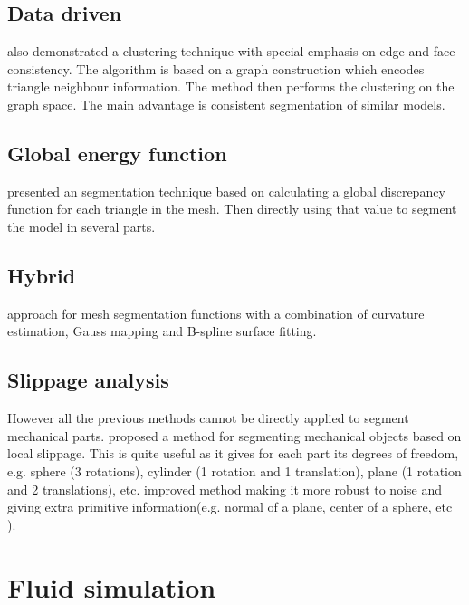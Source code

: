 \subsection{Data driven}

\cite{Golovinskiy2009} also demonstrated a clustering technique with special emphasis on edge and face consistency.
The algorithm is based on a graph construction which encodes triangle neighbour information.
The method then performs the clustering on the graph space.
The main advantage is consistent segmentation of similar models.

\subsection{Global energy function}

\cite{DeCastro2014} presented an segmentation technique based on calculating a global discrepancy function for each triangle in the mesh.
Then directly using that value to segment the model in several parts. 

\subsection{Hybrid}

\cite{Wang2011} approach for mesh segmentation functions with a combination of curvature estimation, Gauss mapping and B-spline surface fitting.

\subsection{Slippage analysis}

However all the previous methods cannot be directly applied to segment mechanical parts.
\cite{Gelfand2004} proposed a method for segmenting mechanical objects based on local slippage.
This is quite useful as it gives for each part its degrees of freedom, e.g. sphere (3 rotations), cylinder (1 rotation and 1 translation), plane (1 rotation and 2 translations), etc.
\cite{Yi2014} improved \cite{Gelfand2004} method making it more robust to noise and giving extra primitive information(e.g. normal of a plane, center of a sphere, etc ).



\section{Fluid simulation}
\label{prevWorkFluidSim}

